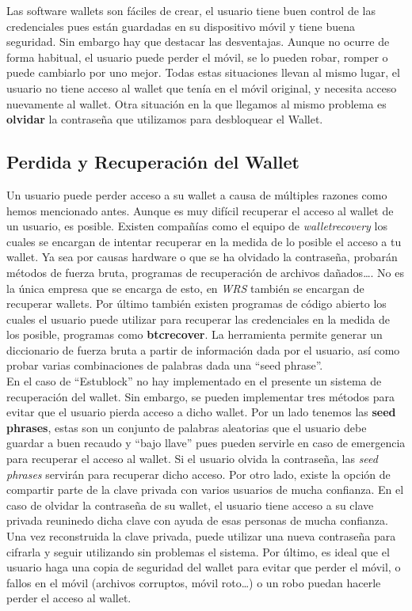 Las software wallets son fáciles de crear, el usuario tiene buen control de las credenciales pues están guardadas en su dispositivo móvil y tiene buena seguridad. Sin embargo hay que destacar las desventajas. Aunque no ocurre de forma habitual, el usuario puede perder el móvil, se lo pueden robar, romper o puede cambiarlo por uno mejor. Todas estas situaciones llevan al mismo lugar, el usuario no tiene acceso al wallet que tenía en el móvil original, y necesita acceso nuevamente al wallet. Otra situación en la que llegamos al mismo problema es \textbf{olvidar} la contraseña que utilizamos para desbloquear el Wallet. \\

\subsection{Perdida y Recuperación del Wallet}

Un usuario puede perder acceso a su wallet a causa de múltiples razones como hemos mencionado antes. Aunque es muy difícil recuperar el acceso al wallet de un usuario, es posible. Existen compañías como el equipo de \emph{walletrecovery}\cite{walletRec} los cuales se encargan de intentar recuperar en la medida de lo posible el acceso a tu wallet. Ya sea por causas hardware o que se ha olvidado la contraseña, probarán métodos de fuerza bruta, programas de recuperación de archivos dañados\dots. No es la única empresa que se encarga de esto, en \emph{WRS}\cite{WRS} también se encargan de recuperar wallets. Por último también existen programas de código abierto los cuales el usuario puede utilizar para recuperar las credenciales en la medida de los posible, programas como \textbf{btcrecover}\cite{btcrecover}. La herramienta permite generar un diccionario de fuerza bruta a partir de información dada por el usuario, así como probar varias combinaciones de palabras dada una ``seed phrase''. \\

En el caso de ``Estublock'' no hay implementado en el presente un sistema de recuperación del wallet. Sin embargo, se pueden implementar tres métodos para evitar que el usuario pierda acceso a dicho wallet. Por un lado tenemos las \textbf{seed phrases}, estas son un conjunto de palabras aleatorias que el usuario debe guardar a buen recaudo y ``bajo llave'' pues pueden servirle en caso de emergencia para recuperar el acceso al wallet. Si el usuario olvida la contraseña, las \emph{seed phrases} servirán para recuperar dicho acceso. Por otro lado, existe la opción de compartir parte de la clave privada con varios usuarios de mucha confianza. En el caso de olvidar la contraseña de su wallet, el usuario tiene acceso a su clave privada reuninedo dicha clave con ayuda de esas personas de mucha confianza. Una vez reconstruida la clave privada, puede utilizar una nueva contraseña para cifrarla y seguir utilizando sin problemas el sistema. Por último, es ideal que el usuario haga una copia de seguridad del wallet para evitar que perder el móvil, o fallos en el móvil (archivos corruptos, móvil roto\dots) o un robo puedan hacerle perder el acceso al wallet. 



